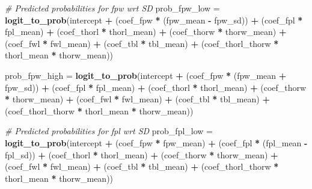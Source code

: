 \documentclass[
]{article}
\newenvironment{Shaded}{\begin{snugshade}}{\end{snugshade}}
\newcommand{\CommentTok}[1]{\textcolor[rgb]{0.56,0.35,0.01}{\textit{#1}}}
\newcommand{\FunctionTok}[1]{\textcolor[rgb]{0.13,0.29,0.53}{\textbf{#1}}}
\newcommand{\NormalTok}[1]{#1}
\newcommand{\OtherTok}[1]{\textcolor[rgb]{0.56,0.35,0.01}{#1}}
\newcommand{\SpecialCharTok}[1]{\textcolor[rgb]{0.81,0.36,0.00}{\textbf{#1}}}
\begin{document}
\begin{Shaded}
\begin{Highlighting}[]
\CommentTok{\# Predicted probabilities for fpw wrt SD}
\NormalTok{prob\_fpw\_low }\OtherTok{=} \FunctionTok{logit\_to\_prob}\NormalTok{(intercept }\SpecialCharTok{+} 
\NormalTok{                               (coef\_fpw }\SpecialCharTok{*}\NormalTok{ (fpw\_mean }\SpecialCharTok{{-}}\NormalTok{ fpw\_sd)) }\SpecialCharTok{+} 
\NormalTok{                               (coef\_fpl }\SpecialCharTok{*}\NormalTok{ fpl\_mean) }\SpecialCharTok{+} 
\NormalTok{                               (coef\_thorl }\SpecialCharTok{*}\NormalTok{ thorl\_mean) }\SpecialCharTok{+} 
\NormalTok{                               (coef\_thorw }\SpecialCharTok{*}\NormalTok{ thorw\_mean) }\SpecialCharTok{+} 
\NormalTok{                               (coef\_fwl }\SpecialCharTok{*}\NormalTok{ fwl\_mean) }\SpecialCharTok{+} 
\NormalTok{                               (coef\_tbl }\SpecialCharTok{*}\NormalTok{ tbl\_mean) }\SpecialCharTok{+} 
\NormalTok{                               (coef\_thorl\_thorw }\SpecialCharTok{*}\NormalTok{ thorl\_mean }\SpecialCharTok{*}\NormalTok{ thorw\_mean))}

\NormalTok{prob\_fpw\_high }\OtherTok{=} \FunctionTok{logit\_to\_prob}\NormalTok{(intercept }\SpecialCharTok{+} 
\NormalTok{                                (coef\_fpw }\SpecialCharTok{*}\NormalTok{ (fpw\_mean }\SpecialCharTok{+}\NormalTok{ fpw\_sd)) }\SpecialCharTok{+} 
\NormalTok{                                (coef\_fpl }\SpecialCharTok{*}\NormalTok{ fpl\_mean) }\SpecialCharTok{+} 
\NormalTok{                                (coef\_thorl }\SpecialCharTok{*}\NormalTok{ thorl\_mean) }\SpecialCharTok{+} 
\NormalTok{                                (coef\_thorw }\SpecialCharTok{*}\NormalTok{ thorw\_mean) }\SpecialCharTok{+} 
\NormalTok{                                (coef\_fwl }\SpecialCharTok{*}\NormalTok{ fwl\_mean) }\SpecialCharTok{+} 
\NormalTok{                                (coef\_tbl }\SpecialCharTok{*}\NormalTok{ tbl\_mean) }\SpecialCharTok{+} 
\NormalTok{                                (coef\_thorl\_thorw }\SpecialCharTok{*}\NormalTok{ thorl\_mean }\SpecialCharTok{*}\NormalTok{ thorw\_mean))}

\CommentTok{\# Predicted probabilities for fpl wrt SD}
\NormalTok{prob\_fpl\_low }\OtherTok{=} \FunctionTok{logit\_to\_prob}\NormalTok{(intercept }\SpecialCharTok{+} 
\NormalTok{                               (coef\_fpw }\SpecialCharTok{*}\NormalTok{ fpw\_mean) }\SpecialCharTok{+} 
\NormalTok{                               (coef\_fpl }\SpecialCharTok{*}\NormalTok{ (fpl\_mean }\SpecialCharTok{{-}}\NormalTok{ fpl\_sd)) }\SpecialCharTok{+} 
\NormalTok{                               (coef\_thorl }\SpecialCharTok{*}\NormalTok{ thorl\_mean) }\SpecialCharTok{+} 
\NormalTok{                               (coef\_thorw }\SpecialCharTok{*}\NormalTok{ thorw\_mean) }\SpecialCharTok{+} 
\NormalTok{                               (coef\_fwl }\SpecialCharTok{*}\NormalTok{ fwl\_mean) }\SpecialCharTok{+} 
\NormalTok{                               (coef\_tbl }\SpecialCharTok{*}\NormalTok{ tbl\_mean) }\SpecialCharTok{+} 
\NormalTok{                               (coef\_thorl\_thorw }\SpecialCharTok{*}\NormalTok{ thorl\_mean }\SpecialCharTok{*}\NormalTok{ thorw\_mean))}


\end{Highlighting}
\end{Shaded}
\end{document}
